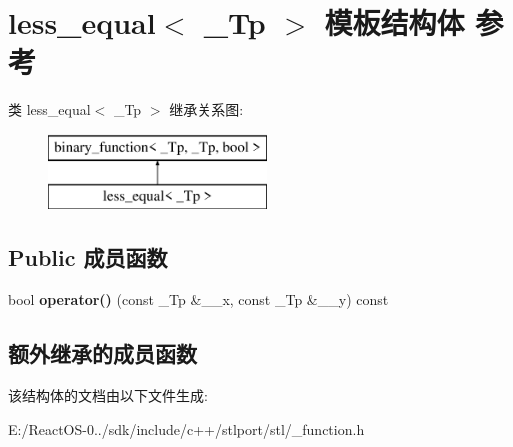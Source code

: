 \hypertarget{structless__equal}{}\section{less\+\_\+equal$<$ \+\_\+\+Tp $>$ 模板结构体 参考}
\label{structless__equal}
类 less\+\_\+equal$<$ \+\_\+\+Tp $>$ 继承关系图\+:\begin{figure}[H]
\begin{center}
\leavevmode
\includegraphics[height=2.000000cm]{structless__equal}
\end{center}
\end{figure}
\subsection*{Public 成员函数}
\begin{DoxyCompactItemize}
\item 
\mbox{\label{structless__equal_a8937135568b728e1a0d7579ccbdd7a3a}} 
bool {\bfseries operator()} (const \+\_\+\+Tp \&\+\_\+\+\_\+x, const \+\_\+\+Tp \&\+\_\+\+\_\+y) const
\end{DoxyCompactItemize}
\subsection*{额外继承的成员函数}


该结构体的文档由以下文件生成\+:\begin{DoxyCompactItemize}
\item 
E\+:/\+React\+O\+S-\/0../sdk/include/c++/stlport/stl/\+\_\+function.\+h\end{DoxyCompactItemize}
